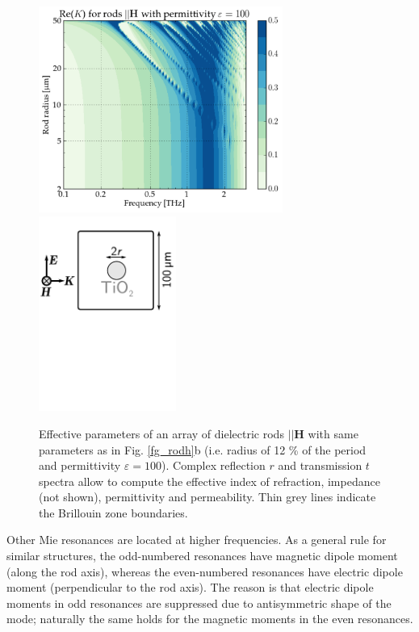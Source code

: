 {\begin{figure}[ht]  \caption{Effective parameters of an array of dielectric rods $||\mathbf H$ with same parameters as in Fig. \ref{fg_rodh}b (i.e. radius of  12 \% of the period and permittivity $\varepsilon = 100$). Complex reflection $r$ and transmission $t$ spectra allow to compute the effective index of refraction, impedance (not shown), permittivity and permeability. Thin grey lines indicate the Brillouin zone boundaries.}
\label{fg_rodh_fdtd} \centering 
\includegraphics[width=8cm]{img/old/HRods_eps100_radiusscan.pdf}
\includegraphics[width=4.5cm]{img/HRods_sketch.pdf}
\end{figure}

Other Mie resonances are located at higher frequencies. As a general rule for similar structures, the odd-numbered resonances have magnetic dipole moment (along the rod axis), whereas the even-numbered resonances have electric dipole moment (perpendicular to the rod axis). The reason is that electric dipole moments in odd resonances are suppressed due to antisymmetric shape of the mode; naturally the same holds for the magnetic moments in the even resonances.

}
